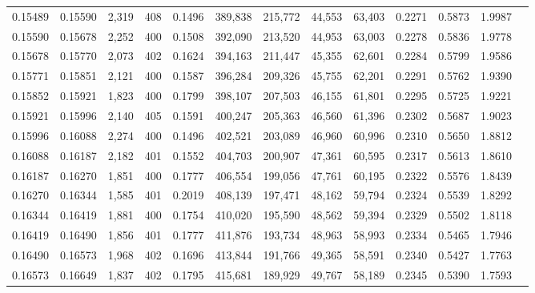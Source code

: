 \begin{tabular}{rrrrrrrrrrrrr}
0.15489 & 0.15590 &  2,319 & 408 &                                     0.1496 & 389,838 & 215,772 &  44,553 &  63,403 & 0.2271 & 0.5873 & 1.9987 \\
0.15590 & 0.15678 &  2,252 & 400 &                                     0.1508 & 392,090 & 213,520 &  44,953 &  63,003 & 0.2278 & 0.5836 & 1.9778 \\
0.15678 & 0.15770 &  2,073 & 402 &                                     0.1624 & 394,163 & 211,447 &  45,355 &  62,601 & 0.2284 & 0.5799 & 1.9586 \\
0.15771 & 0.15851 &  2,121 & 400 &                                     0.1587 & 396,284 & 209,326 &  45,755 &  62,201 & 0.2291 & 0.5762 & 1.9390 \\
0.15852 & 0.15921 &  1,823 & 400 &                                     0.1799 & 398,107 & 207,503 &  46,155 &  61,801 & 0.2295 & 0.5725 & 1.9221 \\
0.15921 & 0.15996 &  2,140 & 405 &                                     0.1591 & 400,247 & 205,363 &  46,560 &  61,396 & 0.2302 & 0.5687 & 1.9023 \\
0.15996 & 0.16088 &  2,274 & 400 &                                     0.1496 & 402,521 & 203,089 &  46,960 &  60,996 & 0.2310 & 0.5650 & 1.8812 \\
0.16088 & 0.16187 &  2,182 & 401 &                                     0.1552 & 404,703 & 200,907 &  47,361 &  60,595 & 0.2317 & 0.5613 & 1.8610 \\
0.16187 & 0.16270 &  1,851 & 400 &                                     0.1777 & 406,554 & 199,056 &  47,761 &  60,195 & 0.2322 & 0.5576 & 1.8439 \\
0.16270 & 0.16344 &  1,585 & 401 &                                     0.2019 & 408,139 & 197,471 &  48,162 &  59,794 & 0.2324 & 0.5539 & 1.8292 \\
0.16344 & 0.16419 &  1,881 & 400 &                                     0.1754 & 410,020 & 195,590 &  48,562 &  59,394 & 0.2329 & 0.5502 & 1.8118 \\
0.16419 & 0.16490 &  1,856 & 401 &                                     0.1777 & 411,876 & 193,734 &  48,963 &  58,993 & 0.2334 & 0.5465 & 1.7946 \\
0.16490 & 0.16573 &  1,968 & 402 &                                     0.1696 & 413,844 & 191,766 &  49,365 &  58,591 & 0.2340 & 0.5427 & 1.7763 \\
0.16573 & 0.16649 &  1,837 & 402 &                                     0.1795 & 415,681 & 189,929 &  49,767 &  58,189 & 0.2345 & 0.5390 & 1.7593 \\

\end{tabular}
